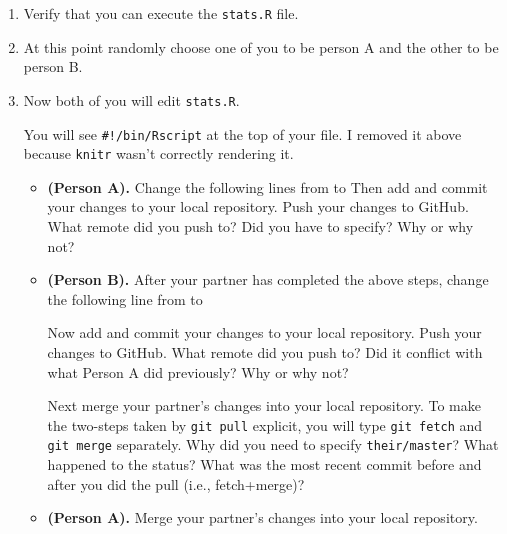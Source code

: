 \documentclass{article}
\begin{document}
\begin{enumerate}
\begin{enumerate}
\item Verify that you can execute the \texttt{stats.R} file.
%

\item At this point randomly choose one of you to be person A
and the other to be person B.

\item Now both of you will edit \texttt{stats.R}.

%
%

You will see \texttt{\#!/bin/Rscript} at the top of your file.  I removed
it above because \texttt{knitr} wasn't correctly rendering it.

\begin{itemize}
\item \textbf{(Person A).} Change the following lines from
to
Then add and commit your changes to your local repository.  Push your changes to
GitHub.  What remote did you push to?  Did you have to specify?  Why or why not?

\item \textbf{(Person B).}  After your partner has completed the above steps,
change the following line from
to

Now add and commit your changes to your local repository. Push your changes to
GitHub. What remote did you push to? Did it conflict with what Person A
did previously? Why or why not?

Next merge your partner's changes into your local repository.  To make the two-steps
taken by \texttt{git pull} explicit, you will type \texttt{git fetch} and
\texttt{git merge} separately.
Why did you need to specify \texttt{their/master}?  What happened to the status?
What was the most recent commit before and after you did the pull (i.e., fetch+merge)?

\item \textbf{(Person A).} Merge your partner's changes into your local repository.


\end{itemize}
\end{enumerate}
\end{enumerate}
\end{document}
